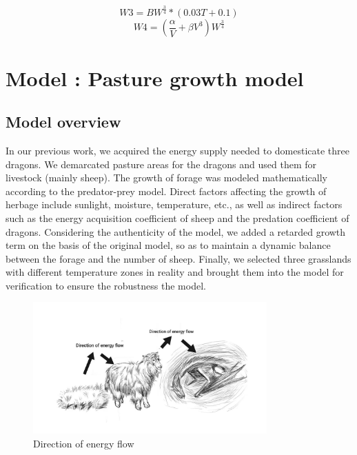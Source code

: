 \documentclass[12pt]{article}  %
\newenvironment{shrinkeq}[1]
{ \bgroup
	\addtolength\abovedisplayshortskip{#1}
	\addtolength\abovedisplayskip{#1}
	\addtolength\belowdisplayshortskip{#1}
	\addtolength\belowdisplayskip{#1}}
{\egroup\ignorespacesafterend}
\begin{document}
\begin{shrinkeq}{-1ex}
	\begin{equation}
    \label{eq:eq14}
	   W3 = BW^{\frac{3}{4}}*(0.03T+0.1) 
	\end{equation}
\end{shrinkeq}
\begin{shrinkeq}{-1ex}
	\begin{equation}
    \label{eq:eq14}
	   W4 = (\frac{\alpha}{V} + \beta V^3)W^\frac{3}{4}
	\end{equation}
\end{shrinkeq}




\section{Model \uppercase\expandafter{} : Pasture growth model }
\vspace{-0.3cm}
\subsection{Model overview}
In our previous work, we acquired the energy supply needed to domesticate three dragons. We demarcated pasture areas for the dragons and used them for livestock (mainly sheep). The growth of forage was modeled mathematically according to the predator-prey model. Direct factors affecting the growth of herbage include sunlight, moisture, temperature, etc., as well as indirect factors such as the energy acquisition coefficient of sheep and the predation coefficient of dragons. Considering the authenticity of the model, we added a retarded growth term on the basis of the original model, so as to maintain a dynamic balance between the forage and the number of sheep. Finally, we selected three grasslands with different temperature zones in reality and brought them into the model for verification to ensure the robustness the model. 
\begin{figure}[h]
	\centering
	\includegraphics[width=0.8\textwidth]{easymcm/img/abc.pdf}
	\caption{Direction of energy flow}
\end{figure}
\end{document}
